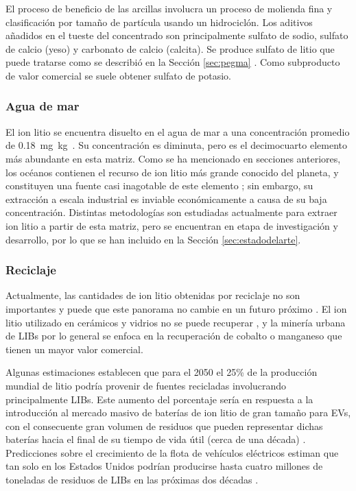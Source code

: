 El proceso de beneficio de las arcillas involucra un proceso de molienda fina y clasificación por tamaño de partícula usando un hidrociclón. Los aditivos añadidos en el tueste del concentrado son principalmente sulfato de sodio, sulfato de calcio (yeso) y carbonato de calcio (calcita). Se produce sulfato de litio que puede tratarse como se describió en la Sección \ref{sec:pegma} \citep{Bacanora2018}. Como subproducto de valor comercial se suele obtener sulfato de potasio.

\subsubsection{Agua de mar}
El ion litio se encuentra disuelto en el agua de mar a una concentración promedio de 0.18~mg~kg\mnn\ \citep{Evans2013}. Su concentración es diminuta, pero es el decimocuarto elemento más abundante en esta matriz. Como se ha mencionado en secciones anteriores, los océanos contienen el recurso de ion litio más grande conocido del planeta, y constituyen una fuente casi inagotable de este elemento \citep{Yang2018}; sin embargo, su extracción a escala industrial es inviable económicamente a causa de su baja concentración. Distintas metodologías son estudiadas actualmente para extraer ion litio a partir de esta matriz, pero se encuentran en etapa de investigación y desarrollo, por lo que se han incluido en la Sección \ref{sec:estadodelarte}.

\subsubsection{Reciclaje}

Actualmente, las cantidades de ion litio obtenidas por reciclaje no son importantes y puede que este panorama no cambie en un futuro próximo \citep{Olivetti2017}. El ion litio utilizado en cerámicos y vidrios no se puede recuperar \citep{CHRISTMANN2015}, y la minería urbana de \acp{LIB} por lo general se enfoca en la recuperación de cobalto o manganeso que tienen un mayor valor comercial. 

Algunas estimaciones establecen que para el 2050 el 25\% de la producción mundial de litio podría provenir de fuentes recicladas involucrando principalmente \ac{LIB}s. Este aumento del porcentaje sería en respuesta a la introducción al mercado masivo de baterías de ion litio de gran tamaño para \ac{EV}s, con el consecuente gran volumen de residuos que pueden representar dichas baterías hacia el final de su tiempo de vida útil (cerca de una década) \citep{STERBA2019416, Evans2013}. Predicciones sobre el crecimiento de la flota de vehículos eléctricos estiman que tan solo en los Estados Unidos podrían producirse hasta cuatro millones de toneladas de residuos de \ac{LIB}s en las próximas dos décadas \citep{RICHA2014}. 

